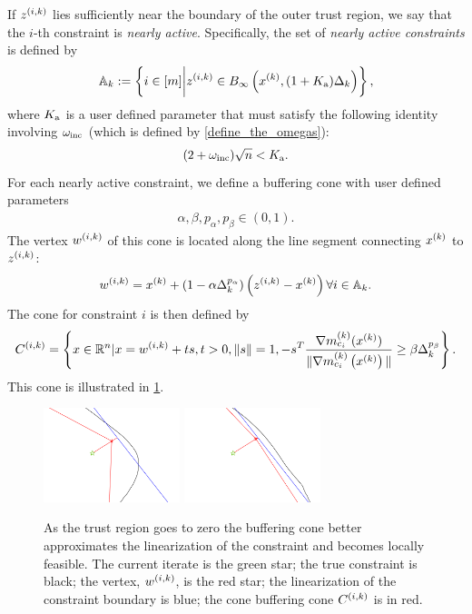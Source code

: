 If ${z^{(i, k)}}$ lies sufficiently near the boundary of the outer trust region, we say that the $i$-th constraint is \emph{nearly active}.
Specifically, the set of {\em nearly active constraints} is defined by
\begin{align}
{\mathbb A_{k}} := \left\{i \in [m] \bigg| {z^{(i, k)}} \in B_{\infty}\left(x^{(k)}, (1+{ K_{\textrm{a}} })\Delta_k\right)\right\}, \label{define_activeconstraints}
\end{align}
where ${ K_{\textrm{a}} }$ is a user defined parameter that must satisfy the following identity involving $\omega_{\text{inc}}$ (which is defined by \cref{define_the_omegas}):
\begin{align}
(2 + \omega_{\text{inc}})\sqrt{n} < { K_{\textrm{a}} }. \label{define_zikthresh}
\end{align}
For each nearly active constraint, we define a buffering cone with user defined parameters
\begin{align}
\alpha, \beta, p_{\alpha}, p_{\beta} \in (0, 1). \label{define_abpab}
\end{align}
The vertex ${w^{(i, k)}}$ of this cone is located along the line segment connecting $x^{(k)}$ to ${z^{(i, k)}}$:
\begin{align}
{w^{(i, k)}} = x^{(k)} + \left(1 - \alpha\Delta_k^{p_{\alpha}}\right)\left({z^{(i, k)}} - x^{(k)}\right) \forall i \in {\mathbb A_{k}}. \label{define_w}
\end{align}
The cone for constraint $i$ is then defined by
\begin{align}
{C^{(i, k)}} = \left\{x \in \mathbb R^n | x = {w^{(i, k)}} + t s,t > 0, \|s\| = 1, -s^T{\frac{\nabla m^{(k)}_{c_i}(x^{(k)})}{\|\nabla m^{(k)}_{c_i}\left(x^{(k)}\right)\|}} \ge \beta \Delta_k^{p_{\beta}} \right\}. \label{define_fik}
\end{align}
This cone is illustrated in \cref{explanation_2}.
\begin{figure}[ht]
    \centering
    \includegraphics[width=150px]{images/explanation_2.png}
    \includegraphics[width=150px]{images/explanation_3.png}
    \caption[An example of a buffering cone.]{
    	As the trust region goes to zero the buffering cone better approximates the linearization of the constraint and becomes locally feasible.
    	The current iterate is the green star;
    	the true constraint is black;
    	the vertex, ${w^{(i, k)}}$, is the red star;
    	the linearization of the constraint boundary is blue;
    	the cone buffering cone ${C^{(i, k)}}$ is in red.
	}
    \label{explanation_2}
\end{figure}

